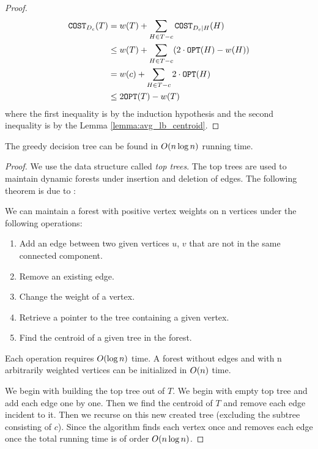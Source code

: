 \begin{theorem}
\begin{proof}
        \begin{align*}
            \texttt{COST}_{D_c}\mathopen{}\left( T \right) &= w\mathopen{}\left( T \right)+\sum_{H\in T-c}\texttt{COST}_{D_c|H}\mathopen{}\left( H \right)\\
            &\leq w\mathopen{}\left( T \right)+\sum_{H\in T-c}\mathopen{}\left( 2\cdot\texttt{OPT}\mathopen{}\left( H \right)-w\mathopen{}\left( H \right) \right)\\
            &= w\mathopen{}\left( c \right)+\sum_{H\in T-c}2\cdot\texttt{OPT}\mathopen{}\left( H \right)\\\
            &\leq 2\texttt{OPT}\mathopen{}\left( T \right)-w\mathopen{}\left( T \right)
        \end{align*}
        where the first inequality is by the induction hypothesis and the second inequality is by the Lemma \ref{lemma:avg_lb_centroid}.
    \end{proof}
\end{theorem}
\begin{theorem}
    The greedy decision tree can be found in $O\mathopen{}\left( n\log n \right)$ running time.
    \begin{proof}
        We use the data structure called \textit{top trees}. The top trees are used to maintain dynamic forests under
insertion and deletion of edges. The following theorem is due to \cite{toptrees}:
    \begin{theorem}
        We can maintain a forest with positive vertex weights on n vertices
under the following operations:
\begin{enumerate}
    \item Add an edge between two given vertices $u$, $v$ that are not in the same connected component.
    \item Remove an existing edge.
    \item Change the weight of a vertex.
    \item Retrieve a pointer to the tree containing a given vertex.
    \item Find the centroid of a given tree in the forest.
\end{enumerate}
Each operation requires $O\mathopen{}\left( \log n \right)$ time. A forest without edges and with n arbitrarily weighted vertices can be
initialized in $O\mathopen{}\left( n \right)$ time.
    \end{theorem}
        We begin with building the top tree out of $T$. We begin with empty top tree and add each edge one by one. Then we find the centroid of $T$ and remove each edge incident to it. Then we recurse on this new created tree (excluding the subtree consisting of $c$). Since the algorithm finds each vertex once and removes each edge once the total running time is of order $O\mathopen{}\left( n\log n \right)$.
    \end{proof}
\end{theorem}
